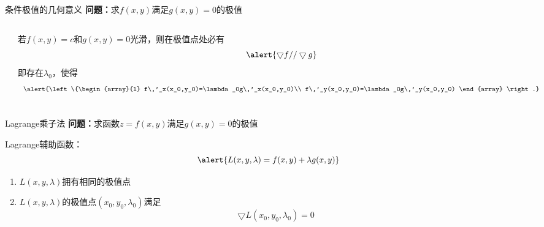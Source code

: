 \begin{frame}{条件极值的几何意义}
	\linespread{1.2}\pause 
	{\bf 问题：}求$f(x,y)$满足$g(x,y)=0$的极值\pause 
	\bigskip
	\begin{columns}
			\begin{center}
				\pause 
			\end{center}
			若$f(x,y)=c$和$g(x,y)=0$光滑，则在极值点处必有
			\vspace{-1em}
			$$\alert{\bigtriangledown f // \bigtriangledown g}$$
			\pause 即存在$\lambda_0$，使得
			$$
			\alert{\left\{\begin{array}{l}
				f\,'_x(x_0,y_0)=\lambda_0g\,'_x(x_0,y_0)\\
				f\,'_y(x_0,y_0)=\lambda_0g\,'_y(x_0,y_0)
			\end{array}
			\right.}$$
	\end{columns}
\end{frame}

\begin{frame}{Lagrange乘子法}
	\linespread{1.2}\pause 
	{\bf 问题：}求函数$z=f(x,y)$满足$g(x,y)=0$的极值\pause 
	
	\bigskip
	{\bb Lagrange辅助函数：}
	$$\alert{L(x,y,\lambda)=f(x,y)+\lambda g(x,y)}$$
	\pause \vspace{-1em}
	\begin{enumerate}
	  \item $L(x,y,\lambda)$拥有相同的极值点\pause 
	  \item $L(x,y,\lambda)$的极值点$(x_0,y_0,\lambda_0)$满足\pause 
	  $$\bigtriangledown L(x_0,y_0,\lambda_0)=0$$
	\end{enumerate}
\end{frame}

